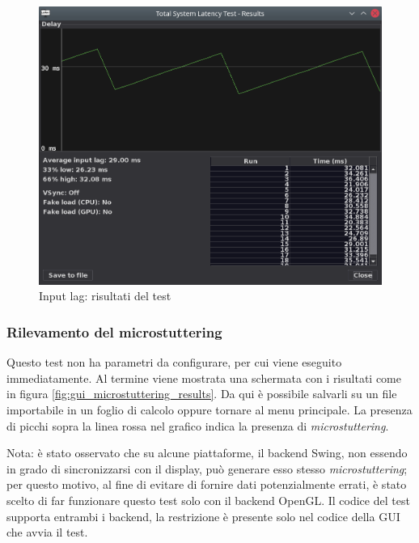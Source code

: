 \begin{figure}[H]
	\centering
	\includegraphics[width=\textwidth]{Applicazione_files/gui_inputlag_results.png}
	\caption{Input lag: risultati del test}
	\label{fig:gui_inputlag_results}
\end{figure}

\subsubsection{Rilevamento del microstuttering}
Questo test non ha parametri da configurare, per cui viene eseguito immediatamente. Al termine viene mostrata una schermata con i risultati come in figura \ref{fig:gui_microstuttering_results}. Da qui è possibile salvarli su un file importabile in un foglio di calcolo oppure tornare al menu principale. La presenza di picchi sopra la linea rossa nel grafico indica la presenza di \textit{microstuttering}.

Nota: è stato osservato che su alcune piattaforme, il backend Swing, non essendo in grado di sincronizzarsi con il display, può generare esso stesso \textit{microstuttering}; per questo motivo, al fine di evitare di fornire dati potenzialmente errati, è stato scelto di far funzionare questo test solo con il backend OpenGL. Il codice del test supporta entrambi i backend, la restrizione è presente solo nel codice della GUI che avvia il test.

